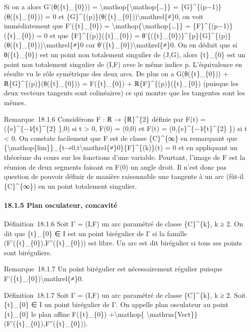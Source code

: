 \documentclass[]{article}
\begin{document}
Si on a alors G'(θ(\{t\}\_\{0\})) =
\textbackslash{}mathop\{\textbackslash{}mathop\{\ldots{}\}\} =
\{G\}\^{}\{(p−1)\}(θ(\{t\}\_\{0\})) = 0 et
\{G\}\^{}\{(p)\}(θ(\{t\}\_\{0\}))\textbackslash{}mathrel\{≠\}0, on voit
immédiatement que F'(\{t\}\_\{0\}) =
\textbackslash{}mathop\{\textbackslash{}mathop\{\ldots{}\}\} =
\{F\}\^{}\{(p−1)\}(\{t\}\_\{0\}) = 0 et que
\{F\}\^{}\{(p)\}(\{t\}\_\{0\}) =
θ'\{(\{t\}\_\{0\})\}\^{}\{p\}\{G\}\^{}\{(p)\}(θ(\{t\}\_\{0\}))\textbackslash{}mathrel\{≠\}0
car θ'(\{t\}\_\{0\})\textbackslash{}mathrel\{≠\}0. On en déduit que si
θ(\{t\}\_\{0\}) est un point non totalement singulier de (J,G), alors
\{t\}\_\{0\} est un point non totalement singulier de (I,F) avec le même
indice p. L'équivalence en résulte vu le rôle symétrique des deux arcs.
De plus on a G(θ(\{t\}\_\{0\})) + ℝ\{G\}\^{}\{(p)\}(θ(\{t\}\_\{0\})) =
F(\{t\}\_\{0\}) + ℝ\{F\}\^{}\{(p)\}(\{t\}\_\{0\}) (puisque les deux
vecteurs tangents sont colinéaires) ce qui montre que les tangentes sont
les mêmes.

Remarque~18.1.6 Considérons F : ℝ → \{ℝ\}\^{}\{2\} définie par F(t) =
(\{e\}\^{}\{−1∕\{t\}\^{}\{2\} \},0) si t \textgreater{} 0, F(0) = (0,0)
et F(t) = (0,\{e\}\^{}\{−1∕\{t\}\^{}\{2\} \}) si t \textless{} 0. On
constate facilement que F est de classe \{C\}\^{}\{∞\} en remarquant que
\{\textbackslash{}mathop\{lim\}\}\_\{t→0,t\textbackslash{}mathrel\{≠\}0\}\{F\}\^{}\{(k)\}(t)
= 0 et en appliquant un théorème du cours sur les fonctions d'une
variable. Pourtant, l'image de F est la réunion de deux segments faisant
en F(0) un angle droit. Il n'est donc pas question de pouvoir définir de
manière raisonnable une tangente à un arc (fût-il \{C\}\^{}\{∞\}) en un
point totalement singulier.

\paragraph{18.1.5 Plan osculateur, concavité}

Définition~18.1.6 Soit Γ = (I,F) un arc paramétré de classe
\{C\}\^{}\{k\}, k ≥ 2. On dit que \{t\}\_\{0\} ∈ I est un point
birégulier de Γ si la famille (F'(\{t\}\_\{0\}),F''(\{t\}\_\{0\})) est
libre. Un arc est dit birégulier si tous ses points sont biréguliers.

Remarque~18.1.7 Un point birégulier est nécessairement régulier puisque
F'(\{t\}\_\{0\})\textbackslash{}mathrel\{≠\}0.

Définition~18.1.7 Soit Γ = (I,F) un arc paramétré de classe
\{C\}\^{}\{k\}, k ≥ 2. Soit \{t\}\_\{0\} ∈ I un point birégulier de Γ.
On appelle plan osculateur au point \{t\}\_\{0\} le plan affine
F(\{t\}\_\{0\}) +\textbackslash{}mathop\{
\textbackslash{}mathrm\{Vect\}\}(F'(\{t\}\_\{0\}),F''(\{t\}\_\{0\})).
\end{document}
